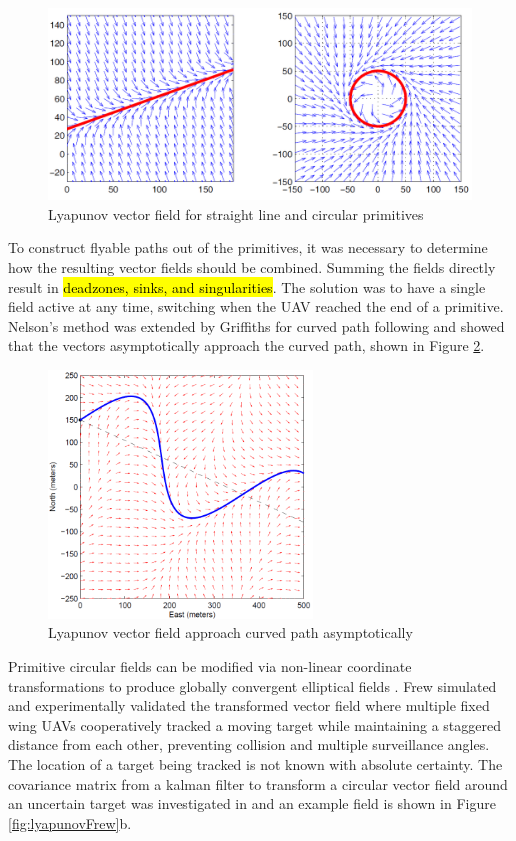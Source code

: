 \documentclass[numbered,pdftex]{ohio-etd}
\begin{document}
\begin{figure}
	\centering
	\includegraphics[width=13cm]{PaperFigures/nelsonLyapunov}
	\caption{Lyapunov vector field for straight line and circular primitives}
	\label{fig:nelsonlyapunov}
\end{figure}

To construct flyable paths out of the primitives, it was necessary to determine how the resulting vector fields should be combined. Summing the fields directly result in \hl{deadzones, sinks, and singularities}. The solution was to have a single field active at any time, switching when the UAV reached the end of a primitive. Nelson's method was extended by Griffiths for curved path following and showed that the vectors asymptotically approach the curved path, shown in Figure \ref{fig:griffiths}.

\begin{figure}
	\centering
	\includegraphics[width=7cm]{PaperFigures/griffiths}
	\caption{Lyapunov vector field approach curved path asymptotically}
	\label{fig:griffiths}
\end{figure}


Primitive circular fields can be modified via non-linear coordinate transformations to produce globally convergent elliptical fields \cite{frew_lyapunov_nodate}\cite{frew_cooperative_2007}. Frew simulated and experimentally validated the transformed vector field where multiple fixed wing UAVs cooperatively tracked a moving target while maintaining a staggered distance from each other, preventing collision and multiple surveillance angles. The location of a target being tracked is not known with absolute certainty. The covariance matrix from a kalman filter to transform a circular vector field around an uncertain target was investigated in \cite{frew_cooperative_2007} and an example field is shown in Figure \ref{fig:lyapunovFrew}b.
\end{document}
